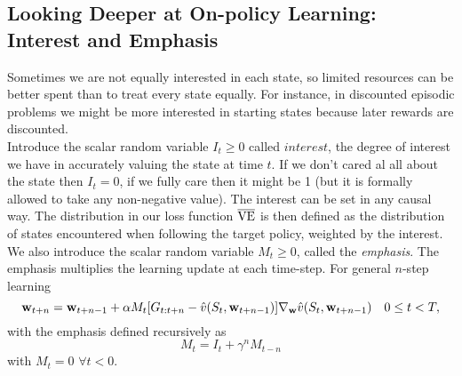 \subsection{Looking Deeper at On-policy Learning: Interest and Emphasis}
Sometimes we are not equally interested in each state, so limited resources can be better spent than to treat every state equally. For instance, in discounted episodic problems we might be more interested in starting states because later rewards are discounted. \\

Introduce the scalar random variable $I_t \geq 0 $ called $interest$, the degree of interest we have in accurately valuing the state at time $t$. If we don't cared al all about the state then $I_t = 0$, if we fully care then it might be 1 (but it is formally allowed to take any non-negative value). The interest can be set in any causal way. The distribution in our loss function $\overline{\mathrm{VE}}$ is then defined as the distribution of states encountered when following the target policy, weighted by the interest.\\

We also introduce the scalar random variable $M_t \geq 0$, called the \emph{emphasis}. The emphasis multiplies the learning update at each time-step. For general $n$-step learning
\begin{equation}
    \mathbf{w}_{t+n} = \mathbf{w}_{t + n - 1} + \alpha M_t [G_{t:t+n} - \hat{v}(S_t, \mathbf{w}_{t+n-1})] \nabla_{\mathbf{w}} \hat{v}(S_t, \mathbf{w}_{t+n-1}) \quad 0 \leq t < T,
\end{equation}
with the emphasis defined recursively as
\begin{equation}
    M_t = I_t + \gamma^n M_{t-n}
\end{equation}
with $M_t = 0$ $\forall t < 0$.



